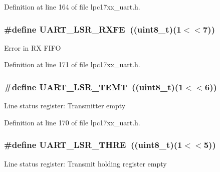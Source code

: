 Definition at line 164 of file lpc17xx\+\_\+uart.\+h.

\subsubsection[{\texorpdfstring{U\+A\+R\+T\+\_\+\+L\+S\+R\+\_\+\+R\+X\+FE}{UART_LSR_RXFE}}]{\setlength{\rightskip}{0pt plus 5cm}\#define U\+A\+R\+T\+\_\+\+L\+S\+R\+\_\+\+R\+X\+FE~(({\bf uint8\+\_\+t})(1$<$$<$7))}\hypertarget{group___u_a_r_t___private___macros_ga5972ac77db6249142b482356427dcf7c}{}\label{group___u_a_r_t___private___macros_ga5972ac77db6249142b482356427dcf7c}
Error in RX F\+I\+FO 

Definition at line 171 of file lpc17xx\+\_\+uart.\+h.

\subsubsection[{\texorpdfstring{U\+A\+R\+T\+\_\+\+L\+S\+R\+\_\+\+T\+E\+MT}{UART_LSR_TEMT}}]{\setlength{\rightskip}{0pt plus 5cm}\#define U\+A\+R\+T\+\_\+\+L\+S\+R\+\_\+\+T\+E\+MT~(({\bf uint8\+\_\+t})(1$<$$<$6))}\hypertarget{group___u_a_r_t___private___macros_gadb3f8bb82f0a253700fdb88d8c609710}{}\label{group___u_a_r_t___private___macros_gadb3f8bb82f0a253700fdb88d8c609710}
Line status register\+: Transmitter empty 

Definition at line 170 of file lpc17xx\+\_\+uart.\+h.

\subsubsection[{\texorpdfstring{U\+A\+R\+T\+\_\+\+L\+S\+R\+\_\+\+T\+H\+RE}{UART_LSR_THRE}}]{\setlength{\rightskip}{0pt plus 5cm}\#define U\+A\+R\+T\+\_\+\+L\+S\+R\+\_\+\+T\+H\+RE~(({\bf uint8\+\_\+t})(1$<$$<$5))}\hypertarget{group___u_a_r_t___private___macros_gae05118527ef8873b9d7b1b0be0153019}{}\label{group___u_a_r_t___private___macros_gae05118527ef8873b9d7b1b0be0153019}
Line status register\+: Transmit holding register empty 

